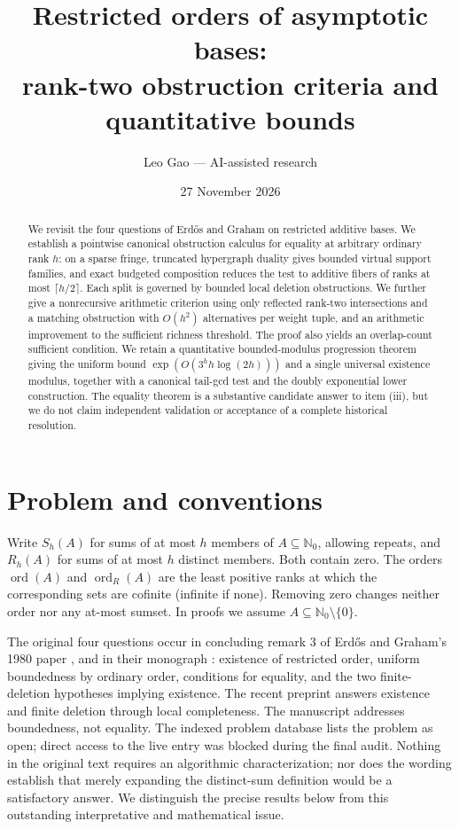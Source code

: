 \documentclass[11pt]{article}
\title{Restricted orders of asymptotic bases:\\ rank-two obstruction criteria and quantitative bounds}
\author{Leo Gao --- AI-assisted research}
\date{27 November 2026}
\theoremstyle{remark}\newtheorem{remark}[theorem]{Remark}
\newcommand{\N}{\mathbb N_0}
\newcommand{\ord}{\operatorname{ord}}
\newcommand{\ordR}{\operatorname{ord}_{R}}
\begin{document}
\maketitle
\begin{abstract}
We revisit the four questions of Erd\H{o}s and Graham on restricted additive bases. We establish a pointwise canonical obstruction calculus for equality at arbitrary ordinary rank $h$: on a sparse fringe, truncated hypergraph duality gives bounded virtual support families, and exact budgeted composition reduces the test to additive fibers of ranks at most $\lceil h/2\rceil$. Each split is governed by bounded local deletion obstructions. We further give a nonrecursive arithmetic criterion using only reflected rank-two intersections and a matching obstruction with $O(h^2)$ alternatives per weight tuple, and an arithmetic improvement to the sufficient richness threshold. The proof also yields an overlap-count sufficient condition. We retain a quantitative bounded-modulus progression theorem giving the uniform bound $\exp(O(3^h h\log(2h)))$ and a single universal existence modulus, together with a canonical tail-gcd test and the doubly exponential lower construction. The equality theorem is a substantive candidate answer to item (iii), but we do not claim independent validation or acceptance of a complete historical resolution.
\end{abstract}
\section{Problem and conventions}
Write $S_h(A)$ for sums of at most $h$ members of $A\subseteq\N$, allowing repeats, and $R_h(A)$ for sums of at most $h$ distinct members. Both contain zero. The orders $\ord(A)$ and $\ordR(A)$ are the least positive ranks at which the corresponding sets are cofinite (infinite if none). Removing zero changes neither order nor any at-most sumset. In proofs we assume $A\subseteq\N\setminus\{0\}$.

The original four questions occur in concluding remark 3 of Erd\H{o}s and Graham's 1980 paper \cite[p. 206]{EG}, and in their monograph \cite[p. 52]{EGbook}: existence of restricted order, uniform boundedness by ordinary order, conditions for equality, and the two finite-deletion hypotheses implying existence. The recent preprint \cite{CYZ} answers existence and finite deletion through local completeness. The manuscript \cite{Gao} addresses boundedness, not equality. The indexed problem database \cite{database} lists the problem as open; direct access to the live entry was blocked during the final audit. Nothing in the original text requires an algorithmic characterization; nor does the wording establish that merely expanding the distinct-sum definition would be a satisfactory answer. We distinguish the precise results below from this outstanding interpretative and mathematical issue.
\end{document}
